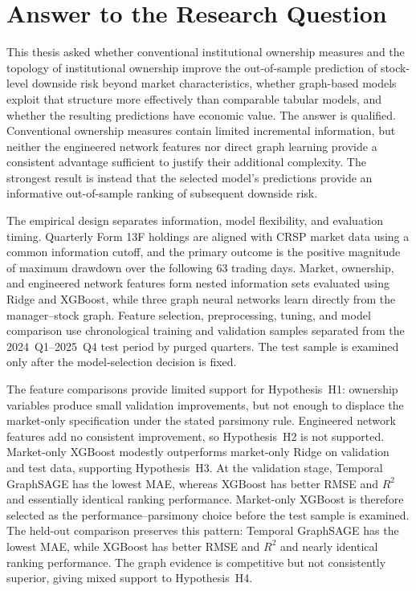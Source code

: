 \section{Answer to the Research Question}
\label{sec:conclusion_summary}

This thesis asked whether conventional institutional ownership measures and the topology of institutional ownership improve the out-of-sample prediction of stock-level downside risk beyond market characteristics, whether graph-based models exploit that structure more effectively than comparable tabular models, and whether the resulting predictions have economic value. The answer is qualified. Conventional ownership measures contain limited incremental information, but neither the engineered network features nor direct graph learning provide a consistent advantage sufficient to justify their additional complexity. The strongest result is instead that the selected model's predictions provide an informative out-of-sample ranking of subsequent downside risk.

The empirical design separates information, model flexibility, and evaluation timing. Quarterly Form 13F holdings are aligned with CRSP market data using a common information cutoff, and the primary outcome is the positive magnitude of maximum drawdown over the following 63 trading days. Market, ownership, and engineered network features form nested information sets evaluated using Ridge and XGBoost, while three graph neural networks learn directly from the manager--stock graph. Feature selection, preprocessing, tuning, and model comparison use chronological training and validation samples separated from the 2024~Q1--2025~Q4 test period by purged quarters. The test sample is examined only after the model-selection decision is fixed.

The feature comparisons provide limited support for Hypothesis~H1: ownership variables produce small validation improvements, but not enough to displace the market-only specification under the stated parsimony rule. Engineered network features add no consistent improvement, so Hypothesis~H2 is not supported. Market-only XGBoost modestly outperforms market-only Ridge on validation and test data, supporting Hypothesis~H3. At the validation stage, Temporal GraphSAGE has the lowest MAE, whereas XGBoost has better RMSE and $R^2$ and essentially identical ranking performance. Market-only XGBoost is therefore selected as the performance--parsimony choice before the test sample is examined. The held-out comparison preserves this pattern: Temporal GraphSAGE has the lowest MAE, while XGBoost has better RMSE and $R^2$ and nearly identical ranking performance. The graph evidence is competitive but not consistently superior, giving mixed support to Hypothesis~H4.

